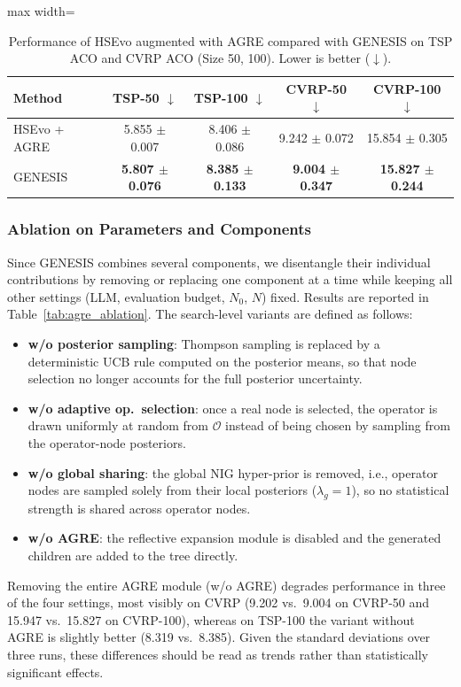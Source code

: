 \documentclass[sigconf,anonymous]{aamas}
\begin{document}
\begin{table}[!htbp]
\centering
\scriptsize
\setlength{\tabcolsep}{3pt}

\caption{Performance of HSEvo augmented with AGRE compared with GENESIS on TSP ACO and CVRP ACO (Size 50, 100). Lower is better ($\downarrow$).}
\label{tab:tsp_cvrp_agre}

\begin{adjustbox}{max width=\columnwidth}
\begin{tabular}{@{}lcccc@{}}
\toprule
Method
& TSP-50 $\downarrow$
& TSP-100 $\downarrow$
& CVRP-50 $\downarrow$
& CVRP-100 $\downarrow$ \\
\midrule
HSEvo + AGRE
& 5.855 $\pm$ 0.007
& 8.406 $\pm$ 0.086
& 9.242 $\pm$ 0.072
& 15.854 $\pm$ 0.305 \\
\midrule
GENESIS
& \textbf{5.807 $\pm$ 0.076}
& \textbf{8.385 $\pm$ 0.133}
& \textbf{9.004 $\pm$ 0.347}
& \textbf{15.827 $\pm$ 0.244} \\
\bottomrule
\end{tabular}
\end{adjustbox}
\end{table}

\subsubsection{Ablation on Parameters and Components}

Since GENESIS combines several components, we disentangle their individual contributions by removing or replacing one component at a time while keeping all other settings (LLM, evaluation budget, $N_0$, $N$) fixed. Results are reported in Table~\ref{tab:agre_ablation}. The search-level variants are defined as follows:
\begin{itemize}
    \item \textbf{w/o posterior sampling}: Thompson sampling is replaced by a deterministic UCB rule computed on the posterior means, so that node selection no longer accounts for the full posterior uncertainty.
    \item \textbf{w/o adaptive op.\ selection}: once a real node is selected, the operator is drawn uniformly at random from $\mathcal{O}$ instead of being chosen by sampling from the operator-node posteriors.
    \item \textbf{w/o global sharing}: the global NIG hyper-prior is removed, i.e., operator nodes are sampled solely from their local posteriors ($\lambda_g = 1$), so no statistical strength is shared across operator nodes.
    \item \textbf{w/o AGRE}: the reflective expansion module is disabled and the generated children are added to the tree directly.
\end{itemize}
Removing the entire AGRE module (w/o AGRE) degrades performance in three of the four settings, most visibly on CVRP (9.202 vs.\ 9.004 on CVRP-50 and 15.947 vs.\ 15.827 on CVRP-100), whereas on TSP-100 the variant without AGRE is slightly better (8.319 vs.\ 8.385). Given the standard deviations over three runs, these differences should be read as trends rather than statistically significant effects.
\end{document}

